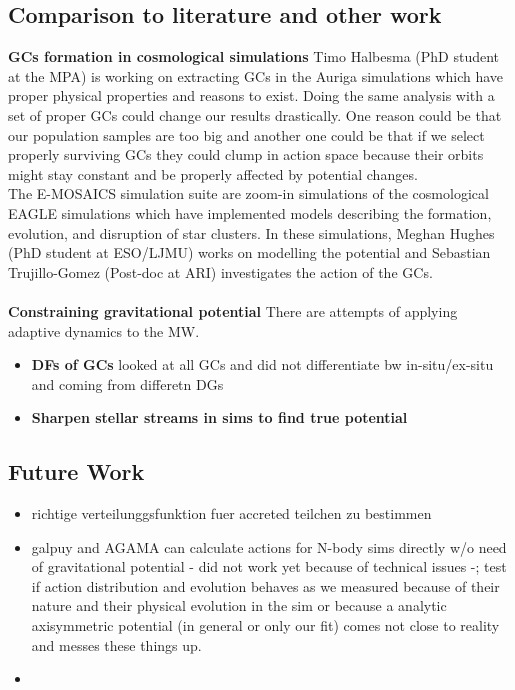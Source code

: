 \subsection{Comparison to literature and other work}
\textbf{\acp{GC} formation in cosmological simulations} Timo Halbesma (PhD student at the MPA) is working on extracting \acp{GC} in the Auriga simulations which have proper physical properties and reasons to exist. Doing the same analysis with a set of proper \acp{GC} could change our results drastically. One reason could be that our population samples are too big and another one could be that if we select properly surviving \acp{GC} they could clump in action space because their orbits might stay constant and be properly affected by potential changes.\\
The E-MOSAICS simulation suite \citep{Pfeffer...E-MOSAICS...2018, Kruijssen...E-MOSAICS.MW..2018} are zoom-in simulations of the cosmological EAGLE \citep{Schaye...EAGLE...2015} simulations which have implemented models describing the formation, evolution, and disruption of star clusters. In these simulations, Meghan Hughes (PhD student at ESO/LJMU) works on modelling the potential and Sebastian Trujillo-Gomez (Post-doc at ARI) investigates the action of the \acp{GC}. 
\\\\
\textbf{Constraining gravitational potential}
There are attempts of applying adaptive dynamics to the \ac{MW}.
\begin{itemize}
    \item \textbf{\acp{DF} of \acp{GC}} \citep{Posti...MWmassGCs...2018}
    looked at all GCs and did not differentiate bw in-situ/ex-situ and coming from differetn \acp{DG}
    \item \textbf{Sharpen stellar streams in sims to find true potential} \citep{Sanderson...gravpotstreams...2017}
\end{itemize}


\subsection{Future Work}
\begin{itemize}
    \item richtige verteilunggsfunktion fuer accreted teilchen zu bestimmen 
    \item galpuy and AGAMA can calculate actions for N-body sims directly w/o need of gravitational potential - did not work yet because of technical issues -; test if action distribution and evolution behaves as we measured because of their nature and their physical evolution in the sim or because a analytic axisymmetric potential (in general or only our fit) comes not close to reality and messes these things up.
    \item 
\end{itemize}

